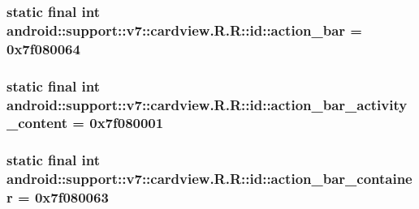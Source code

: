 \hypertarget{classandroid_1_1support_1_1v7_1_1cardview_1_1_r_1_1id_4c4113b657366c9226874e8c14244942}{
\subsubsection[{action\_\-bar}]{\setlength{\rightskip}{0pt plus 5cm}static final int android::support::v7::cardview.R.R::id::action\_\-bar = 0x7f080064}}
\label{classandroid_1_1support_1_1v7_1_1cardview_1_1_r_1_1id_4c4113b657366c9226874e8c14244942}


\hypertarget{classandroid_1_1support_1_1v7_1_1cardview_1_1_r_1_1id_65533fee240730b85ed078ca400e5956}{
\subsubsection[{action\_\-bar\_\-activity\_\-content}]{\setlength{\rightskip}{0pt plus 5cm}static final int android::support::v7::cardview.R.R::id::action\_\-bar\_\-activity\_\-content = 0x7f080001}}
\label{classandroid_1_1support_1_1v7_1_1cardview_1_1_r_1_1id_65533fee240730b85ed078ca400e5956}


\hypertarget{classandroid_1_1support_1_1v7_1_1cardview_1_1_r_1_1id_5afbe27e8e7402eb84cbbbc0d84ed0e4}{
\subsubsection[{action\_\-bar\_\-container}]{\setlength{\rightskip}{0pt plus 5cm}static final int android::support::v7::cardview.R.R::id::action\_\-bar\_\-container = 0x7f080063}}
\label{classandroid_1_1support_1_1v7_1_1cardview_1_1_r_1_1id_5afbe27e8e7402eb84cbbbc0d84ed0e4}


